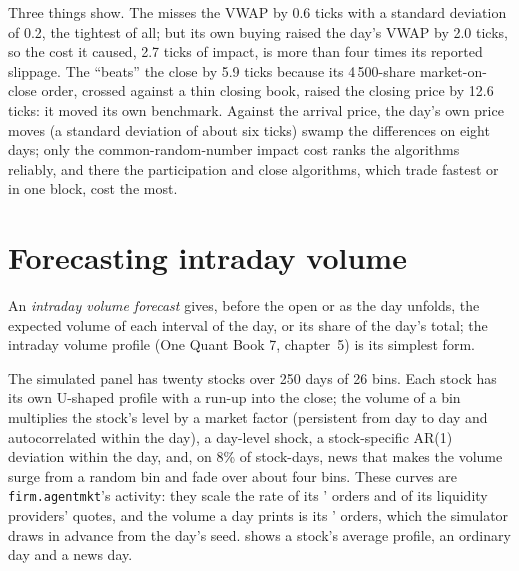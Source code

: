 Three things show. The  misses the VWAP by 0.6 ticks with a standard deviation of 0.2, the tightest of all; but its own buying raised
the day's VWAP by 2.0 ticks, so the cost it caused, 2.7 ticks of impact, is more than four times its reported slippage. The 
``beats'' the close by 5.9 ticks because its 4\,500-share market-on-close order, crossed against a thin closing book, raised the closing price by 12.6
ticks: it moved its own benchmark. Against the arrival price, the day's own price moves (a standard deviation of about six ticks) swamp the
differences on eight days; only the common-random-number impact cost ranks the algorithms reliably, and there the participation and close
algorithms, which trade fastest or in one block, cost the most.

\section{Forecasting intraday volume}

\begin{definition}\label{def:mx:benchmark-algorithms:forecast}
An \emph{intraday volume forecast} gives, before the open or as the day unfolds, the expected volume of each interval
of the day, or its share of the day's total; the intraday volume profile (One Quant Book 7, chapter~5) is its simplest form.
\end{definition}

The simulated panel has twenty stocks over 250 days of 26 bins. Each stock has its own U-shaped profile with a run-up into the close; the volume of a
bin multiplies the stock's level by a market factor (persistent from day to day and autocorrelated within the day), a day-level shock, a stock-specific
AR(1) deviation within the day, and, on 8\% of stock-days, news that makes the volume surge from a random bin and fade over about four bins. These
curves are \texttt{firm.agentmkt}'s activity: they scale the rate of its ' orders and of its liquidity providers' quotes, and the volume
a day prints is its ' orders, which the simulator draws in advance from the day's seed.  shows a
stock's average profile, an ordinary day and a news day.

